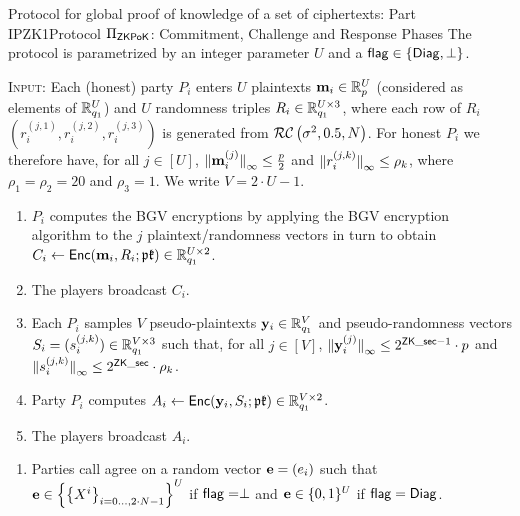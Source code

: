 

\begin{Boxfig}{Protocol for global proof of knowledge of a set of ciphertexts: Part I}{PZK1}{Protocol $\Pi_{\mathsf{ZKPoK}}$: Commitment, Challenge and Response Phases}
The protocol is parametrized by an integer parameter $U$ and 
a $\mathsf{flag}  \in \left\{ \mathsf{Diag}, \perp \right\}$.

\vspace{3mm}

\noindent
\textsc{Input}:
Each (honest) party $P_i$ enters $U$ plaintexts $\mathbf{m}_i \in \mathbb{R}_p^U$ (considered
as elements of $\mathbb{R}_{q_1}^U$) and $U$ randomness triples
$R_i \in \mathbb{R}_{q_1}^{U \times 3}$, where each row of $R_i$ 
$(r_i^{(j,1)},r_i^{(j,2)},r_i^{(j,3)})$ is generated from $\mathcal{RC}\left( \sigma^2, 0.5, N \right)$.
For honest $P_i$  we therefore have, for all $j \in [U]$, 
${\Vert \mathbf{m}_i^{(j)} \Vert}_\infty \le \frac{p}{2}$
and 
${\Vert r_i^{(j,k)} \Vert}_\infty \le \rho_k$,
where $\rho_1 = \rho_2 =20 $ and $\rho_3=1$.
We write $V=2 \cdot U-1$.

\vspace{3mm}

\begin{enumerate}
\item $P_i$ computes the BGV encryptions by applying the BGV encryption algorithm 
  to the $j$ plaintext/randomness vectors in turn to obtain 
  $C_i \leftarrow \mathsf{Enc}(\mathbf{m}_i,R_i; \mathfrak{pk}) \in \mathbb{R}_{q_1}^{U \times 2}$.
\item The players broadcast $C_i$.
\item Each $P_i$ samples $V$ pseudo-plaintexts $\mathbf{y}_i \in \mathbb{R}_{q_1}^V$
  and pseudo-randomness vectors $S_i = (s_i^{(j,k)}) \in \mathbb{R}_{q_1}^{V \times 3}$ such that,
for all $j \in [V]$,
${\Vert \mathbf{y}_i^{(j)} \Vert}_\infty \le 2^{\mathsf{ZK\_sec}-1} \cdot p$
and
${\Vert s_i^{(j,k)} \Vert}_\infty \le 2^{\mathsf{ZK\_sec}} \cdot \rho_k$.
\item Party $P_i$ computes
  $A_i \leftarrow \mathsf{Enc}(\mathbf{y}_i,S_i; \mathfrak{pk}) \in \mathbb{R}_{q_1}^{V \times 2}$.
\item The players broadcast $A_i$.
\end{enumerate}

\begin{enumerate}
  \item Parties call agree on a random vector $\mathbf{e}=(e_i)$
    such that $\mathbf{e} \in \left\{ \left\{ X^i \right\}_{i=0 \ldots, 2 \cdot N-1} \right\}^U$ if $\mathsf{flag}=\perp$ and $\mathbf{e} \in \{0,1\}^U$ if $\mathsf{flag}=\mathsf{Diag}$.
\end{enumerate}


\end{Boxfig}

